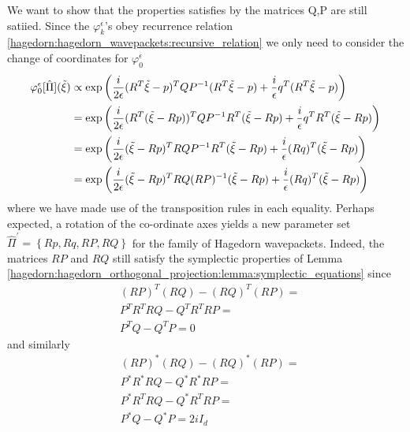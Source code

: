 We want to show that the properties satisfies by the matrices Q,P are still 
satiied.
Since the $\varphi_k^{\epsilon}$'s obey recurrence relation 
\eqref{hagedorn:hagedorn_wavepackets:recursive_relation} we only need to consider 
the change of coordinates for $\varphi_0^\epsilon$ 
\begin{align}
  \varphi_0^{\epsilon}[\hat{\Pi}](\tilde{\xi}) 
  &
  \propto
  \exp{\left( \frac{i}{2\epsilon}
      (R^T\tilde{\xi}-p)^TQP^{-1}(R^T\tilde{\xi}-p) +
  \frac{i}{\epsilon}q^T(R^T\tilde{\xi}-p)\right)}
  \notag
  \\
  &=
  \exp{\left( \frac{i}{2\epsilon}
      (R^T(\tilde{\xi}-Rp))^TQP^{-1}R^T(\tilde{\xi}-Rp) +
  \frac{i}{\epsilon}q^TR^T(\tilde{\xi}-Rp)\right)}
  \notag
  \\
  &=
  \exp{\left( \frac{i}{2\epsilon}
      (\tilde{\xi}-Rp)^TRQP^{-1}R^T(\tilde{\xi}-Rp) +
  \frac{i}{\epsilon}(Rq)^T(\tilde{\xi}-Rp)\right)}
  \notag
  \\
  &=
  \exp{\left( \frac{i}{2\epsilon}
      (\tilde{\xi}-Rp)^TRQ(RP)^{-1}(\tilde{\xi}-Rp) +
  \frac{i}{\epsilon}(Rq)^T(\tilde{\xi}-Rp)\right)}
\end{align}
where we have made use of the transposition rules in each equality.
Perhaps expected, a rotation of the co-ordinate axes yields a new parameter
set $\hat{\Pi}^\prime = \left\{Rp, Rq, RP, RQ \right\}$ 
for the family of Hagedorn wavepackets. Indeed, the matrices $RP$ and 
$RQ$ still satisfy the symplectic properties of 
Lemma \ref{hagedorn:hagedorn_orthogonal_projection:lemma:symplectic_equations} since 
\begin{equation}
  \begin{split}
    & (RP)^T (RQ) - (RQ)^T(RP) =
    \\
    & P^TR^T RQ - Q^TR^TRP = 
    \\
    & P^TQ - Q^TP = 0
  \end{split}
\end{equation}
and similarly 
\begin{equation}
  \begin{split}
    & (RP)^* (RQ) - (RQ)^*(RP) =
    \\
    & P^*R^* RQ - Q^*R^*RP = 
    \\
    & P^*R^T RQ - Q^*R^TRP = 
    \\
    & P^*Q - Q^*P = 2iI_d
  \end{split}
\end{equation}
%
%
%
%
